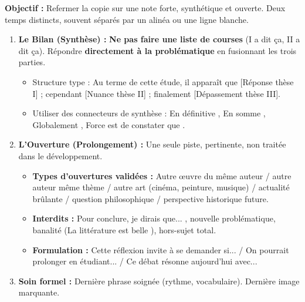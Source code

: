 \documentclass[11pt]{article}
\begin{document}
\begin{methode}
    \textbf{Objectif :} Refermer la copie sur une note forte, synthétique et ouverte. Deux temps distincts, souvent séparés par un alinéa ou une ligne blanche.
    \begin{enumerate}
        \item \textbf{Le Bilan (Synthèse) :} \textbf{Ne pas faire une liste de courses} (I a dit ça, II a dit ça). Répondre \textbf{directement à la problématique} en fusionnant les trois parties.
            \begin{itemize}
                \item Structure type : \og Au terme de cette étude, il apparaît que [Réponse thèse I] ; cependant [Nuance thèse II] ; finalement [Dépassement thèse III]. \fg
                \item Utiliser des connecteurs de synthèse : \og En définitive \fg, \og En somme \fg, \og Globalement \fg, \og Force est de constater que \fg.
            \end{itemize}
        \item \textbf{L'Ouverture (Prolongement) :} Une seule piste, pertinente, non traitée dans le développement.
            \begin{itemize}
                \item \textbf{Types d'ouvertures validées :} Autre œuvre du même auteur / autre auteur même thème / autre art (cinéma, peinture, musique) / actualité brûlante / question philosophique / perspective historique future.
                \item \textbf{Interdits :} \og Pour conclure, je dirais que... \fg, nouvelle problématique, banalité (\og La littérature est belle \fg), hors-sujet total.
                \item \textbf{Formulation :} \og Cette réflexion invite à se demander si... \fg / \og On pourrait prolonger en étudiant... \fg / \og Ce débat résonne aujourd'hui avec... \fg
            \end{itemize}
        \item \textbf{Soin formel :} Dernière phrase soignée (rythme, vocabulaire). Dernière image marquante.
    \end{enumerate}
\end{methode}
\end{document}
